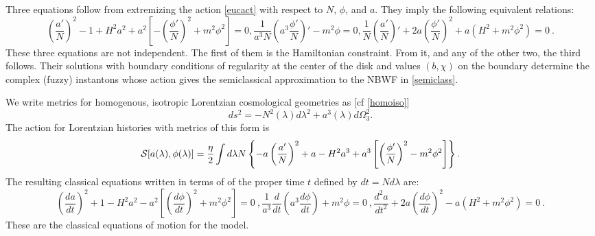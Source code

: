 \documentclass[prd,floats,superscriptaddress,eqsecnum,floatfix,nofootinbib,12pt]{revtex4}
\def\ah{a}
\def\Nh{N}
\def\phih{\phi}
\def\be{\begin{equation}}
\def\ee{\end{equation}}
\begin{document}
{{{{Three equations follow from extremizing the action \eqref{eucact}  with respect to $N$, $\phi$, and $a$. 
They imply the following equivalent relations:
\begin{subequations}
\label{euceqns_N}
\begin{equation}
\left(\frac{a'}{N}\right)^2 -1 +H^2a^2 +a^2\left[-\left(\frac{\phi'}{N}\right)^2 + m^2\phi^2\right]=0,
\label{eucconstraint_N}
\end{equation}
\begin{equation}
\frac{1}{a^3N}\left(a^3\frac{\phi'}{N}\right)' - m^2 \phi = 0 , 
\label{eucphieqn_N}
\end{equation}
\begin{equation}
\frac{1}{N}\left(\frac{a'}{N}\right)' +2a\left(\frac{\phi'}{N}\right)^2 + a(H^2+m^2\phi^2) = 0 \ .
\label{eucaeqn_N}
\end{equation}
\end{subequations}
These three equations are not independent. The first of them is the Hamiltonian constraint. From it, and any of the other two, the third follows. Their solutions with boundary conditions of regularity at the center of the disk and values $(b,\chi)$ on the boundary determine the complex (fuzzy) instantons whose action gives the semiclassical approximation to the NBWF in \eqref{semiclass}. 

We write metrics for homogenous, isotropic Lorentzian cosmological geometries as [cf \eqref{homoiso}]  
\be
ds^2 = -\Nh^2(\lambda) d\lambda^2 + \ah^3(\lambda) d\Omega^2_3 .
\label{homoiso1}
\ee
The action for Lorentzian histories with metrics of this form is
\begin{equation} 
{\cal  S}[\ah(\lambda),\phih(\lambda)] = \frac{\eta}{2}\int d\lambda \Nh \left\{ -\ah \left(\frac{\ah'}{\Nh}\right)^2 +\ah -H^2\ah^3 +\ah^3\left[\left(\frac{\phih'}{\Nh}\right)^2 - m^2\phih^2\right]\right\}.
\label{loract}
\end{equation}
 The resulting classical equations written in terms of of the proper time $t$ defined by  $dt=\Nh d\lambda$ are:  
\begin{subequations}
\label{loreqns}
\begin{equation}
\left(\frac{d\ah}{dt}\right)^2 +1 -H^2\ah^2 -\ah^2\left[\left(\frac{d\phih}{dt}\right)^2 + m^2\phih^2\right]=0\  ,
\label{lorconstraint}
\end{equation}
\begin{equation}
\frac{1}{\ah^3}\frac{d}{dt}\left(\ah^3\frac{d\phih}{dt}\right)+ m^2 \phi = 0\  , 
\label{lorphieqn}
\end{equation}
\begin{equation}
\frac{d^2\ah}{dt^2} +2\ah\left(\frac{d\phih}{dt}\right)^2 -\ah(H^2+m^2\phih^2) = 0 \ .
\end{equation}
\end{subequations}
These are the classical equations of motion for the model. 

}}}}
\end{document}
